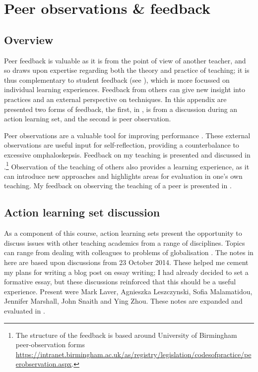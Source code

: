 \chapter{Peer observations \& feedback}\label{ap:peer}

\section{Overview}

Peer feedback is valuable as it is from the point of view of another teacher, and so draws upon expertise regarding both the theory and practice of teaching; it is thus complementary to student feedback (see ), which is more focussed on individual learning experiences. Feedback from others can give new insight into practices and an external perspective on techniques. In this appendix are presented two forms of feedback, the first, in , is from a discussion during an action learning set, and the second is peer observation.

Peer observations are a valuable tool for improving performance \citep{Ketteridge2015}. These external observations are useful input for self-reflection, providing a counterbalance to excessive omphaloskepsis. Feedback on my teaching is presented and discussed in .\footnote{The structure of the feedback is based around University of Birmingham peer-observation forms \url{https://intranet.birmingham.ac.uk/as/registry/legislation/codesofpractice/peerobservation.aspx}.} Observation of the teaching of others also provides a learning experience, as it can introduce new approaches and highlights areas for evaluation in one's own teaching. My feedback on observing the teaching of a peer is presented in .

\section{Action learning set discussion}\label{sec:ALS}

As a component of this course, action learning sets present the opportunity to discuss issues with other teaching academics from a range of disciplines. Topics can range from dealing with colleagues to problems of globalisation \citep[cf.][]{Marshall2015}. The notes in  here are based upon discussions from 23 October 2014. These helped me cement my plans for writing a blog post on essay writing; I had already decided to set a formative essay, but these discussions reinforced that this should be a useful experience. Present were Mark Laver, Agnieszka Leszczynski, Sofia Malamatidou, Jennifer Marshall, John Snaith and Ying Zhou. These notes are expanded and evaluated in .

